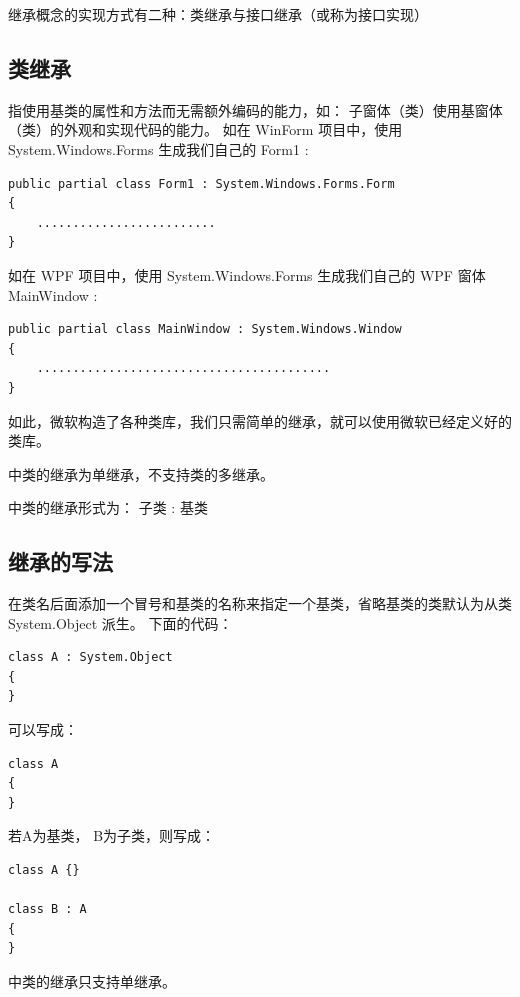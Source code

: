 继承概念的实现方式有二种：类继承与接口继承（或称为接口实现）


\subsection{ \cs 类继承}

指使用基类的属性和方法而无需额外编码的能力，如：
子窗体（类）使用基窗体（类）的外观和实现代码的能力。
如在 WinForm 项目中，使用 System.Windows.Forms 生成我们自己的 Form1 :

\begin{lstlisting}
public partial class Form1 : System.Windows.Forms.Form
{
	.........................   
}
\end{lstlisting}

如在 WPF 项目中，使用 System.Windows.Forms 生成我们自己的 WPF 窗体 MainWindow :

\begin{lstlisting}
public partial class MainWindow : System.Windows.Window
{
	.........................................
}
\end{lstlisting}

如此，微软构造了各种类库，我们只需简单的继承，就可以使用微软已经定义好的类库。

\cs 中类的继承为单继承，不支持类的多继承。

\cs 中类的继承形式为： 子类 : 基类


\subsection{继承的写法}

在类名后面添加一个冒号和基类的名称来指定一个基类，省略基类的类默认为从类 System.Object 派生。
下面的代码：

\begin{lstlisting}
class A : System.Object
{
}
\end{lstlisting}

可以写成：

\begin{lstlisting}
class A
{
}
\end{lstlisting}

若A为基类， B为子类，则写成：

\begin{lstlisting}
class A {}

class B : A
{
}
\end{lstlisting}

\cs 中类的继承只支持单继承。

